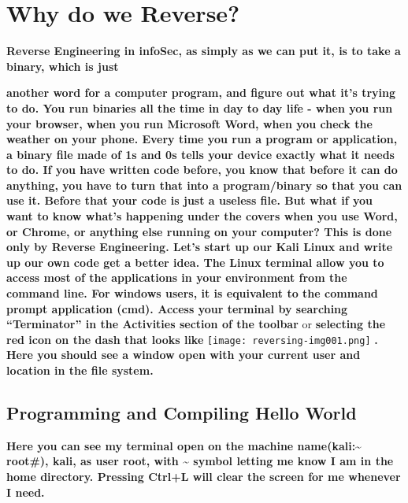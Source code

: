 \section{Why do we Reverse?}
\textbf{Reverse Engineering in infoSec, as simply as we can put it, is to take a
}\textbf{\textcolor[rgb]{0.21960784,0.4627451,0.11372549}{binary, }}\textbf{which is just }

\textbf{another word for a computer program, and figure out what it's trying to do. You run binaries all the time in day
to day life - when you run your browser, when you run Microsoft Word, when you check the weather on your phone. Every
time you run a program or application, a binary file made of 1s and 0s tells your device exactly what it needs to do.
\newline
\newline
If you have written code before, you know that before it can do anything, you have to turn that into a program/binary so
that you can use it. Before that your code is just a useless file. But what if you want to know what's happening under
the covers when you use Word, or Chrome, or anything else running on your computer? This is done only by Reverse
Engineering.  \newline
\newline
Let's start up our Kali Linux and write up our own code get a better idea. The Linux terminal allow you to access most
of the applications in your environment from the command line. For windows users, it is equivalent to the command
prompt application (cmd). Access your terminal by searching ``Terminator'' in the Activities section of the toolbar
}or\textbf{ selecting the red icon on the dash that looks like }
\texttt{[image: reversing-img001.png]}
 \textbf{. Here you should see a window open with your current user and location in the file system.\newline
}

\subsection{Programming and Compiling Hello World}

{\centering
{}
 \par}
\textbf{Here you can see my terminal open on the machine name(kali:\~{} root\#), kali, as user root, with \~{} symbol
letting me know I am in the home directory. Pressing Ctrl+L will clear the screen for me whenever I need.\newline
}

